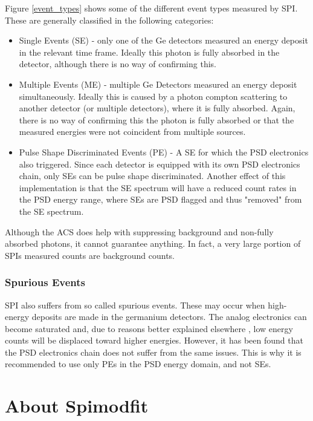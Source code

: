 \documentclass{report}
\begin{document}
Figure \ref{event_types} shows some of the different event types measured by SPI. These are generally classified in the following categories:

\begin{itemize}
  \item Single Events (SE) - only one of the Ge detectors measured an energy deposit in the relevant time frame. Ideally this photon is fully absorbed in the detector, although there is no way of confirming this.
  \item Multiple Events (ME) - multiple Ge Detectors measured an energy deposit simultaneously. Ideally this is caused by a photon compton scattering to another detector (or multiple detectors), where it is fully absorbed. Again, there is no way of confirming this the photon is fully absorbed or that the measured energies were not coincident from multiple sources.
  \item Pulse Shape Discriminated Events (PE) - A SE for which the PSD electronics also triggered. Since each detector is equipped with its own PSD electronics chain, only SEs can be pulse shape discriminated. Another effect of this implementation is that the SE spectrum will have a reduced count rates in the PSD energy range, where SEs are PSD flagged and thus "removed" from the SE spectrum. 
\end{itemize}

Although the ACS does help with suppressing background and non-fully absorbed photons, it cannot guarantee  anything. In fact, a very large portion of SPIs measured counts are background counts. 

\subsubsection*{Spurious Events} \label{sec spurious events}
SPI also suffers from so called spurious events. These may occur when high-energy deposits are made in the germanium detectors. The analog electronics can become saturated and, due to reasons better explained elsewhere \cite{Roques}, low energy counts will be displaced toward higher energies. However, it has been found that the PSD electronics chain does not suffer from the same issues. This is why it is recommended to use only PEs in the PSD energy domain, and not SEs. 


\section{About Spimodfit} \label{about smf}
\end{document}
